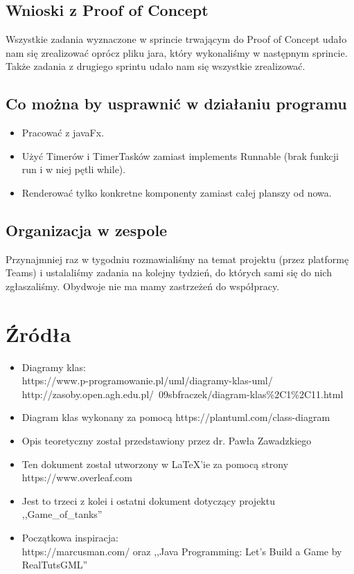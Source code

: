 \documentclass{article}
\begin{document}
\subsection{Wnioski z Proof of Concept}
Wszystkie zadania wyznaczone w sprincie trwającym do Proof of Concept udało nam się zrealizować oprócz pliku jara, który wykonaliśmy w następnym sprincie. Także zadania z drugiego sprintu udało nam się wszystkie zrealizować.

\subsection{Co można by usprawnić w działaniu programu} 
\begin{itemize}
    \item Pracować z javaFx.
    \item Użyć Timerów i TimerTasków zamiast implements Runnable (brak funkcji run i w niej pętli while).
    \item Renderować tylko konkretne komponenty zamiast całej planszy od nowa.
\end{itemize}

\subsection{Organizacja w zespole}
Przynajmniej raz w tygodniu rozmawialiśmy na temat projektu (przez platformę Teams) i ustalaliśmy zadania na kolejny tydzień, do których sami się do nich zgłaszaliśmy. Obydwoje nie ma mamy zastrzeżeń do współpracy.

\section{Źródła}
\begin{itemize}
    \item Diagramy klas: \\
    https://www.p-programowanie.pl/uml/diagramy-klas-uml/ \\
    http://zasoby.open.agh.edu.pl/~09sbfraczek/diagram-klas\%2C1\%2C11.html
    
    \item Diagram klas wykonany za pomocą https://plantuml.com/class-diagram
    
    \item Opis teoretyczny został przedstawiony przez dr. Pawła Zawadzkiego
    
    \item Ten dokument został utworzony w LaTeX'ie za pomocą strony https://www.overleaf.com
    
    \item  Jest to trzeci z kolei i ostatni dokument dotyczący projektu ,,Game\_of\_tanks''
    
    \item Początkowa inspiracja: \\
        https://marcusman.com/ oraz 
        ,,Java Programming: Let’s Build a Game by RealTutsGML''
\end{itemize}
\end{document}

